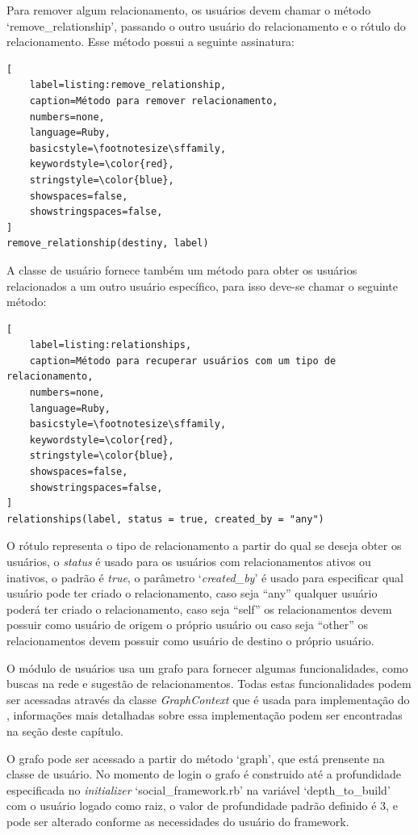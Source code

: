 Para remover algum relacionamento, os usuários devem chamar o método `remove\_relationship', passando o outro usuário do relacionamento e o rótulo do relacionamento. Esse método possui a seguinte assinatura:

\begin{lstlisting}[
    label=listing:remove_relationship,
    caption=Método para remover relacionamento,
    numbers=none,
    language=Ruby,
    basicstyle=\footnotesize\sffamily,
    keywordstyle=\color{red},
    stringstyle=\color{blue},
    showspaces=false,
    showstringspaces=false,
]
remove_relationship(destiny, label)
\end{lstlisting}

A classe de usuário fornece também um método para obter os usuários relacionados a um outro usuário específico, para isso deve-se chamar o seguinte método:

\begin{lstlisting}[
    label=listing:relationships,
    caption=Método para recuperar usuários com um tipo de relacionamento,
    numbers=none,
    language=Ruby,
    basicstyle=\footnotesize\sffamily,
    keywordstyle=\color{red},
    stringstyle=\color{blue},
    showspaces=false,
    showstringspaces=false,
]
relationships(label, status = true, created_by = "any")
\end{lstlisting}

O rótulo representa o tipo de relacionamento a partir do qual se deseja obter os usuários, o \textit{status} é usado para os usuários com relacionamentos ativos ou inativos, o padrão é \textit{true}, o parâmetro `\textit{created\_by}' é usado para especificar qual usuário pode ter criado o relacionamento, caso seja ``any'' qualquer usuário poderá ter criado o relacionamento, caso seja ``self'' os relacionamentos devem possuir como usuário de origem o próprio usuário ou caso seja ``other'' os relacionamentos devem possuir como usuário de destino o próprio usuário.

O módulo de usuários usa um grafo para fornecer algumas funcionalidades, como buscas na rede e sugestão de relacionamentos. Todas estas funcionalidades podem ser acessadas através da classe \textit{GraphContext} que é usada para implementação do , informações mais detalhadas sobre essa implementação podem ser encontradas na seção  deste capítulo.

O grafo pode ser acessado a partir do método `graph', que está prensente na classe de usuário. No momento de login o grafo é construido até a profundidade especificada no \textit{initializer} `social\_framework.rb' na variável `depth\_to\_build' com o usuário logado como raiz, o valor de profundidade padrão definido é 3, e pode ser alterado conforme as necessidades do usuário do framework.

